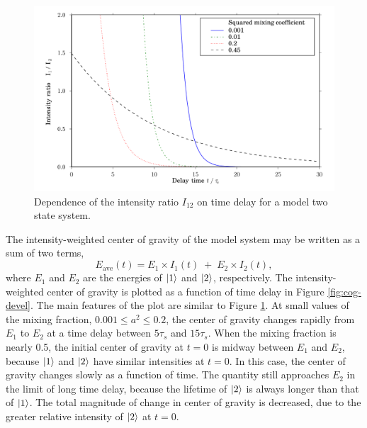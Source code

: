 \documentclass[12pt]{mitthesis}
\begin{document}
\begin{figure}
  \caption{Dependence of the intensity ratio $I_{12}$ on time delay
    for a model two state system.}
  \label{fig:ratio-devel}

  \centering
  \includegraphics[width=6in]{ratio-development.pdf}
\end{figure}

The intensity-weighted center of gravity of the model system may be
written as a sum of two terms,
\begin{equation}
  E_{\text{ave}}(t) = E_1 \times I_1(t) \; + \; E_2 \times I_2(t),
\end{equation}
where $E_1$ and $E_2$ are the energies of $\mathinner{|{1}\rangle}$ and $\mathinner{|{2}\rangle}$,
respectively.  The intensity-weighted center of gravity is plotted as
a function of time delay in Figure \ref{fig:cog-devel}.  The main
features of the plot are similar to Figure \ref{fig:ratio-devel}.  At
small values of the mixing fraction, $0.001 \leq a^2 \leq 0.2$, the
center of gravity changes rapidly from $E_1$ to $E_2$ at a time delay
between $5\tau_s$ and $15\tau_s$.  When the mixing fraction is nearly
0.5, the initial center of gravity at $t=0$ is midway between $E_1$
and $E_2$, because $\mathinner{|{1}\rangle}$ and $\mathinner{|{2}\rangle}$ have similar intensities at
$t=0$.  In this case, the center of gravity changes slowly as a
function of time.  The quantity still approaches $E_2$ in the limit of
long time delay, because the lifetime of $\mathinner{|{2}\rangle}$ is always longer
than that of $\mathinner{|{1}\rangle}$.  The total magnitude of change in center of
gravity is decreased, due to the greater relative intensity of
$\mathinner{|{2}\rangle}$ at $t=0$.
\end{document}
